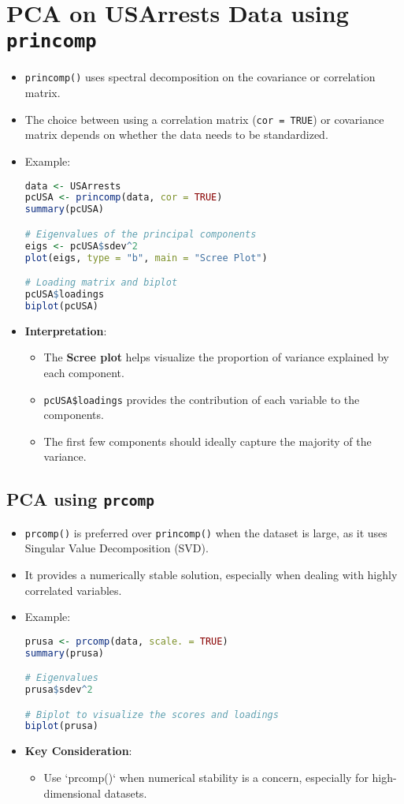 \documentclass{article}
\begin{document}
\section{PCA on USArrests Data using \texttt{princomp}}
\begin{itemize}
    \item \texttt{princomp()} uses spectral decomposition on the covariance or correlation matrix.
    \item The choice between using a correlation matrix (\texttt{cor = TRUE}) or covariance matrix depends on whether the data needs to be standardized.
    \item Example:
\begin{lstlisting}[language=R]
data <- USArrests
pcUSA <- princomp(data, cor = TRUE)
summary(pcUSA)

# Eigenvalues of the principal components
eigs <- pcUSA$sdev^2
plot(eigs, type = "b", main = "Scree Plot")

# Loading matrix and biplot
pcUSA$loadings
biplot(pcUSA)
\end{lstlisting}

\item \textbf{Interpretation}:
    \begin{itemize}
        \item The \textbf{Scree plot} helps visualize the proportion of variance explained by each component.
        \item \texttt{pcUSA\$loadings} provides the contribution of each variable to the components.
        \item The first few components should ideally capture the majority of the variance.
    \end{itemize}
\end{itemize}

\subsection{PCA using \texttt{prcomp}}
\begin{itemize}
    \item \texttt{prcomp()} is preferred over \texttt{princomp()} when the dataset is large, as it uses Singular Value Decomposition (SVD).
    \item It provides a numerically stable solution, especially when dealing with highly correlated variables.
    \item Example:
\begin{lstlisting}[language=R]
prusa <- prcomp(data, scale. = TRUE)
summary(prusa)

# Eigenvalues
prusa$sdev^2

# Biplot to visualize the scores and loadings
biplot(prusa)
\end{lstlisting}
\item \textbf{Key Consideration}:
    \begin{itemize}
        \item Use `prcomp()` when numerical stability is a concern, especially for high-dimensional datasets.
    \end{itemize}
\end{itemize}
\end{document}

